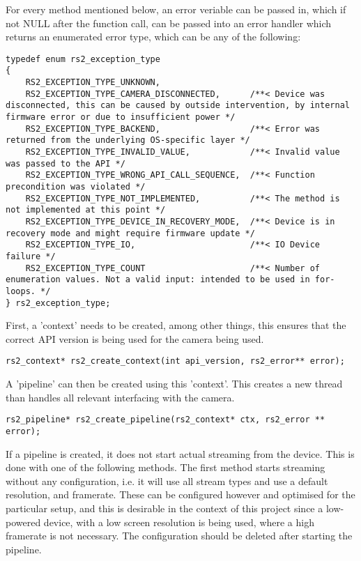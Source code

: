     For every method mentioned below, an error veriable can be passed in, which if not NULL after the function call, can be passed into an error handler which returns an enumerated error type, which can be any of the following:

    \begin{lstlisting}[style=CStyle]
typedef enum rs2_exception_type
{
    RS2_EXCEPTION_TYPE_UNKNOWN,
    RS2_EXCEPTION_TYPE_CAMERA_DISCONNECTED,      /**< Device was disconnected, this can be caused by outside intervention, by internal firmware error or due to insufficient power */
    RS2_EXCEPTION_TYPE_BACKEND,                  /**< Error was returned from the underlying OS-specific layer */
    RS2_EXCEPTION_TYPE_INVALID_VALUE,            /**< Invalid value was passed to the API */
    RS2_EXCEPTION_TYPE_WRONG_API_CALL_SEQUENCE,  /**< Function precondition was violated */
    RS2_EXCEPTION_TYPE_NOT_IMPLEMENTED,          /**< The method is not implemented at this point */
    RS2_EXCEPTION_TYPE_DEVICE_IN_RECOVERY_MODE,  /**< Device is in recovery mode and might require firmware update */
    RS2_EXCEPTION_TYPE_IO,                       /**< IO Device failure */
    RS2_EXCEPTION_TYPE_COUNT                     /**< Number of enumeration values. Not a valid input: intended to be used in for-loops. */
} rs2_exception_type;\end{lstlisting}

    First, a 'context' needs to be created, among other things, this ensures that the correct API version is being used for the camera being used.
    \begin{lstlisting}[style=CStyle]
rs2_context* rs2_create_context(int api_version, rs2_error** error);\end{lstlisting}

    A 'pipeline' can then be created using this 'context'. This creates a new thread than handles all relevant interfacing with the camera.

    \begin{lstlisting}[style=CStyle]
rs2_pipeline* rs2_create_pipeline(rs2_context* ctx, rs2_error ** error);\end{lstlisting}   

    If a pipeline is created, it does not start actual streaming from the device. This is done with one of the following methods. The first method starts streaming without any configuration, i.e. it will use all stream types and use a default resolution, and framerate. These can be configured however and optimised for the particular setup, and this is desirable in the context of this project since a low-powered device, with a low screen resolution is being used, where a high framerate is not necessary. The configuration should be deleted after starting the pipeline.

